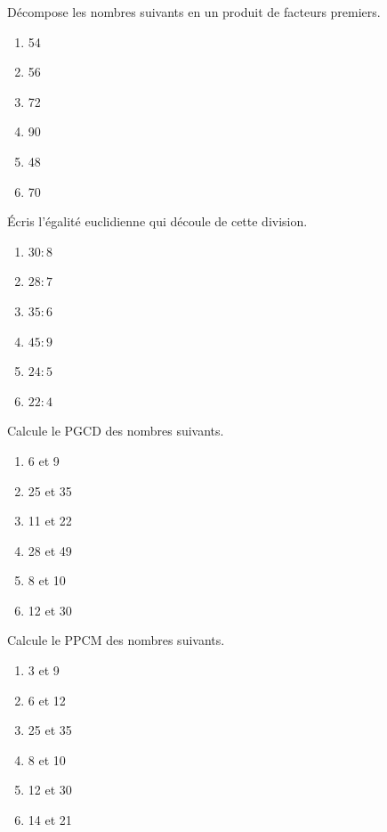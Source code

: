 \documentclass[12pt,parskip=half-, twoside=semi]{scrartcl}
\begin{document}
\setcounter{exercise}{0}


    \begin{exercise}
        Décompose les nombres suivants en un produit de facteurs premiers.

      \begin{enumerate}[cols=3]
          \item 54
          \item 56
          \item 72
          \item 90
          \item 48
          \item 70
      \end{enumerate}
    \end{exercise}
    
    \begin{exercise}
      Écris l'égalité euclidienne qui découle de cette
    division.
      \begin{enumerate}[cols=3]
        \item $30 : 8$
        \item $28 : 7$
        \item $35 : 6$
        \item $45 : 9$
        \item $24 : 5$
        \item $22 : 4$
      \end{enumerate}
    \end{exercise}
    
    \begin{exercise}
      Calcule le PGCD des nombres suivants.
    \begin{enumerate}[cols=3]
        \item 6 et 9
        \item 25 et 35
        \item 11 et 22
        \item 28 et 49
        \item 8 et 10
        \item 12 et 30
      \end{enumerate}
    \end{exercise}
    
    \begin{exercise}
      Calcule le PPCM des nombres suivants.
      \begin{enumerate}[cols=3]
        \item 3 et 9
        \item 6 et 12
        \item 25 et 35
        \item 8 et 10
        \item 12 et 30
        \item 14 et 21
      \end{enumerate}
    \end{exercise}
    
\end{document}
